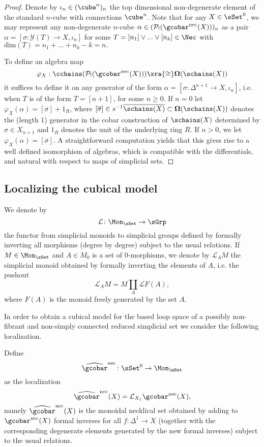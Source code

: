 \begin{proof} 
Denote by $\iota_n \in (\cube^n)_n$ the top dimensional non-degenerate element of the standard $n$-cube with connections $\cube^n$. Note that for any $X \in \sSet^0$, we may represent any non-degenerate $n$-cube $\alpha \in (\mathcal{P}_!(\gcobar^{\text{nec}}(X)))_n$ as a pair $\alpha=[\sigma: \mathcal{Y}(T) \to X, \iota_n]$ for some $T=[n_1] \vee ... \vee [n_k] \in \Nec$ with $\text{dim}(T)=n_1+ ...+n_k-k=n.$

To define an algebra map
$$\varphi_X: \cchains(\mathcal{P}_!(\gcobar^{\text{nec}}(X))) \xra{\cong} \mathbf{\Omega}(\schains(X))$$
it suffices to define it on any generator of the form $\alpha=[\sigma \colon \Delta^{n+1} \to X, \iota_{n}]$, i.e. when $T$ is of the form $T=[n+1]$, for some $n\geq0$. If $n=0$ let $\varphi_X(\alpha)= [\overline{\sigma}]+ 1_R$, where $[\overline{\sigma}] \in s^{-1} \overline{ \schains(X)} \subset \mathbf{\Omega}(\schains(X))$ denotes the (length $1$) generator in the cobar construction of $\schains(X)$ determined by $\sigma \in X_{n+1}$ and $1_R$ denotes the unit of the underlying ring $R$. If $n>0$, we let $\varphi_X(\alpha)=[\overline{\sigma}]$. A straightforward computation yields that this gives rise to a well defined isomorphism of algebras, which is compatible with the differentials, and natural with respect to maps of simplicial sets.  
\end{proof}

\subsection{Localizing the cubical model}

We denote by $$\mathcal{L} \colon \Mon_{\sSet} \to \sGrp$$ the functor from simplicial monoids to simplicial groups defined by formally inverting all morphisms (degree by degree) subject to the usual relations. If $M \in \Mon_{\sSet}$ and $A \in M_0$ is a set of $0$-morphisms, we denote by $\mathcal{L}_AM$ the simplicial monoid obtained by formally inverting the elements of $A$, i.e. the pushout
$$\mathcal{L}_AM = M \coprod_{A} \mathcal{L}F(A),$$
where $F(A)$ is the monoid freely generated by the set $A$. 

In order to obtain a cubical model for the based loop space of a possibly non-fibrant and non-simply connected reduced simplicial set we consider the following localization. 

Define 
$$\widehat{\gcobar}^{\text{nec}} \colon \sSet^0 \to \Mon_{\nSet}$$
as the localization
$$\widehat{\gcobar}^{\text{nec}}(X)= \mathcal{L}_{X_1}\gcobar^{\text{nec}}(X),$$
namely $\widehat{\gcobar}^{\text{nec}}(X)$ is the monoidal necklical set obtained by adding to $\gcobar^{\text{nec}}(X)$  formal inverses for all $f\colon \Delta^1 \to X$ (together with the corresponding degenerate elements generated by the new formal inverses) subject to the usual relations. 

